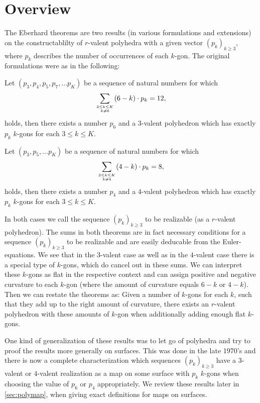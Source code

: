 \section{Overview}

The {\sc Eberhard} theorems are two results (in various formulations and extensions) on the constructablilty of $r$-valent polyhedra with a given vector $(p_k)_{k \geq 3}$, where $p_k$ describes the number of occurrences of each $k$-gon. The original formulations were as in the following:
\begin{theorem}\label{thm:eberhard:3} Let $(p_3, p_4, p_5, p_7, \dots p_K)$ be a sequence of natural numbers for which
\begin{align*}
  \sum_{3 \leq k \leq K \atop k \neq 6}(6 - k) \cdot p_k = 12,
\end{align*}
holds, then there exists a number $p_6$ and a $3$-valent polyhedron which has exactly $p_k$ $k$-gons for each $3 \leq k \leq K$.
\end{theorem}
\begin{theorem}\label{thm:eberhard:4} Let $(p_3,  p_5, \dots p_K)$ be a sequence of natural numbers for which
\begin{align*}
  \sum_{3 \leq k \leq K \atop k \neq 4}(4 - k) \cdot p_k = 8,
\end{align*}
holds, then there exists a number $p_4$ and a $4$-valent polyhedron which has exactly $p_k$ $k$-gons for each $3 \leq k \leq K$.
\end{theorem}

In both cases we call the sequence $(p_k)_{k \geq 3}$ to be realizable (as a $r$-valent polyhedron). The sums in both theorems are in fact necessary conditions for a sequence $(p_k)_{k \geq 3}$ to be realizable and are easily deducable from the {\sc Euler}-equations. We see that in the $3$-valent case as well as in the $4$-valent case there is a special type of $k$-gons, which do cancel out in these sums. We can interpret these $k$-gons as flat in the respective context and can assign positive and negative curvature to each $k$-gon (where the amount of curvature equals $6 - k$ or $4 - k$). Then we can restate the theorems as: Given a number of $k$-gons for each $k$, such that they add up to the right amount of curvature, there exists an $r$-valent polyhedron with these amounts of $k$-gon when additionally adding enough flat $k$-gons.

One kind of generalization of these results was to let go of polyhedra and try to proof the results more generally on surfaces. This was done in the late 1970's  and there is now a complete characterization which sequences $(p_k)_{k\geq 3}$ have a $3$-valent or $4$-valent realization as a map on some surface with $p_k$ $k$-gons when choosing the value of $p_6$ or $p_4$ appropriately. We review these results later in \autoref{sec:polymap}, when giving exact definitions for maps on surfaces.

